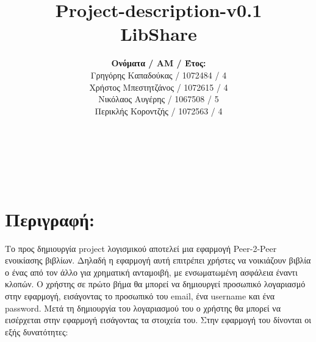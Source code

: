 \documentclass[12pt,a4paper]{article}
\title{Project-description-v0.1 \\ LibShare}
\author{\textbf{Ονόματα / ΑΜ / Έτος:} \\ Γρηγόρης Καπαδούκας / 1072484 / 4\textdegree \\ Χρήστος Μπεστητζάνος / 1072615 / 4\textdegree \\ Νικόλαος Αυγέρης / 1067508 / 5\textdegree \\ Περικλής Κοροντζής / 1072563 / 4\textdegree}
\begin{document}
\makeatletter
\begin{center}
	\LARGE{\@title} \\
	\pagebreak
	\begin{LARGE}\@author\end{LARGE} \\
\end{center}
\pagebreak

\section{Περιγραφή:}
\label{Περιγραφή}
Το προς δημιουργία project λογισμικού αποτελεί μια εφαρμογή Peer-2-Peer ενοικίασης βιβλίων. Δηλαδή η εφαρμογή αυτή επιτρέπει χρήστες να νοικιάζουν βιβλία ο ένας από τον άλλο για χρηματική ανταμοιβή, με ενσωματωμένη ασφάλεια έναντι κλοπών. Ο χρήστης σε πρώτο βήμα θα μπορεί να δημιουργεί προσωπικό λογαριασμό στην εφαρμογή, εισάγοντας το προσωπικό του email, ένα username και ένα password. Μετά τη δημιουργία του λογαριασμού του ο χρήστης θα μπορεί να εισέρχεται στην εφαρμογή εισάγοντας τα στοιχεία του. Στην εφαρμογή του δίνονται οι εξής δυνατότητες:
\end{document}
